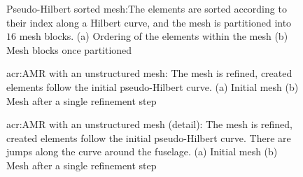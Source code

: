 

\begin{figure}[H]
	\centering
	\caption{Pseudo-Hilbert sorted mesh:The elements are sorted according to their index along a Hilbert curve, and the mesh is partitioned into \(16\) mesh blocks. (a) Ordering of the elements within the mesh (b) Mesh blocks once partitioned}\label{fig:mesh_hilbert}
\end{figure}

\begin{figure}[H]
	\centering
	\caption{\Acrlong{acr:AMR} with an unstructured mesh: The mesh is refined, created elements follow the initial pseudo-Hilbert curve. (a) Initial mesh (b) Mesh after a single refinement step}\label{fig:mesh_P0_adaptivity_far}
\end{figure}

\begin{figure}[H]
	\centering
	\caption{\Acrlong{acr:AMR} with an unstructured mesh (detail): The mesh is refined, created elements follow the initial pseudo-Hilbert curve. There are jumps along the curve around the fuselage. (a) Initial mesh (b) Mesh after a single refinement step}\label{fig:mesh_P0_adaptivity_near}
\end{figure}